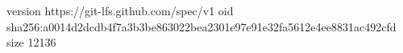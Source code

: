 version https://git-lfs.github.com/spec/v1
oid sha256:a0014d2dcdb4f7a3b3be863022bea2301e97e91e32fa5612e4ee8831ac492cfd
size 12136
